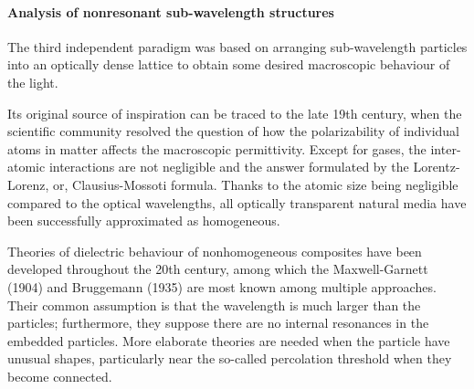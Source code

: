\paragraph{Analysis of nonresonant sub-wavelength structures} %
The third independent paradigm was based on arranging sub-wavelength particles into an optically dense lattice to obtain some desired macroscopic behaviour of the light. 

Its original source of inspiration can be traced to the late 19th century, when the scientific community resolved the question of how the polarizability of individual atoms in matter affects the macroscopic permittivity. Except for gases, the inter-atomic interactions are not negligible and the answer formulated by the Lorentz-Lorenz, or, Clausius-Mossoti formula. Thanks to the atomic size being negligible compared to the optical wavelengths, all optically transparent natural media have been successfully approximated as homogeneous. 

Theories of dielectric behaviour of nonhomogeneous composites have been developed throughout the 20th century, among which the Maxwell-Garnett (1904) and Bruggemann (1935) are most known among multiple approaches. 
Their common assumption is that the wavelength is much larger than the particles; furthermore, they suppose there are no internal resonances in the embedded particles. More elaborate theories are needed when the particle have unusual shapes, particularly near the so-called percolation threshold when they become connected.

